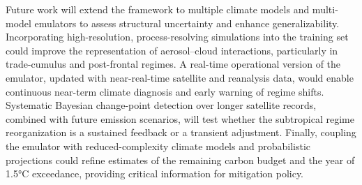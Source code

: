 \documentclass{article}
\begin{document}
Future work will extend the framework to multiple climate models and multi-model emulators to assess structural uncertainty and enhance generalizability. Incorporating high-resolution, process-resolving simulations into the training set could improve the representation of aerosol–cloud interactions, particularly in trade-cumulus and post-frontal regimes. A real-time operational version of the emulator, updated with near-real-time satellite and reanalysis data, would enable continuous near-term climate diagnosis and early warning of regime shifts. Systematic Bayesian change-point detection over longer satellite records, combined with future emission scenarios, will test whether the subtropical regime reorganization is a sustained feedback or a transient adjustment. Finally, coupling the emulator with reduced-complexity climate models and probabilistic projections could refine estimates of the remaining carbon budget and the year of 1.5°C exceedance, providing critical information for mitigation policy.



\end{document}
